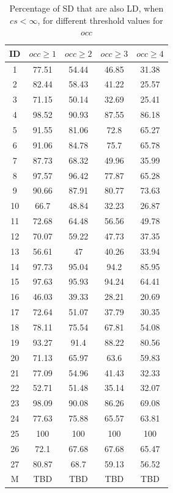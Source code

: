 \documentclass[a4paper,twoside]{article}
\begin{document}
\begin{table}[!h]
\renewcommand{\arraystretch}{1.25}
\caption{Percentage of SD that are also LD,  when  $cs< \infty$, for different threshold values for $occ$ }
\label{table:11}
\centering
\begin{tabular}{|c|c|c|c|c|}
\hline
    ID  & $occ\geq 1$ & $occ\geq 2$ & $occ\geq 3$ & $occ\geq 4$  \\
\hline
1	&	77.51	&	54.44	&	46.85	&	31.38	\\
2	&	82.44	&	58.43	&	41.22	&	25.57	\\
3	&	71.15	&	50.14	&	32.69	&	25.41	\\
4	&	98.52	&	90.93	&	87.55	&	86.18	\\
5	&	91.55	&	81.06	&	72.8	&	65.27	\\
6	&	91.06	&	84.78	&	75.7	&	65.78	\\
7	&	87.73	&	68.32	&	49.96	&	35.99	\\
8	&	97.57	&	96.42	&	77.87	&	65.28	\\
9	&	90.66	&	87.91	&	80.77	&	73.63	\\
10	&	66.7	&	48.84	&	32.23	&	26.87	\\
11	&	72.68	&	64.48	&	56.56	&	49.78	\\
12	&	70.07	&	59.22	&	47.73	&	37.35	\\
13	&	56.61	&	47	&	40.26	&	33.94	\\
14	&	97.73	&	95.04	&	94.2	&	85.95	\\
15	&	97.63	&	95.93	&	94.24	&	64.41	\\
16	&	46.03	&	39.33	&	28.21	&	20.69	\\
17	&	72.64	&	51.07	&	37.79	&	30.35	\\
18	&	78.11	&	75.54	&	67.81	&	54.08	\\
19	&	93.27	&	91.4	&	88.22	&	80.56	\\
20	&	71.13	&	65.97	&	63.6	&	59.83	\\
21	&	77.09	&	54.96	&	41.43	&	32.33	\\
22	&	52.71	&	51.48	&	35.14	&	32.07	\\
23	&	98.09	&	90.08	&	86.26	&	69.08	\\
24	&	77.63	&	75.88	&	65.57	&	63.81	\\
25	&	100	&	100	&	100	&	100	\\
26	&	72.1	&	67.68	&	67.68	&	65.47	\\
27	&	80.87	&	68.7	&	59.13	&	56.52	\\
\hline
M	&	TBD&	TBD	&	TBD	&	TBD	\\
\hline
\end{tabular}
\end{table}
\end{document}
